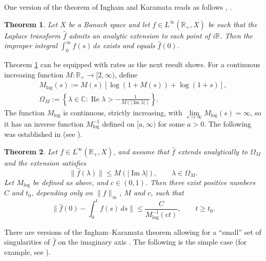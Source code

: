 \documentclass[11pt]{amsart}
\newtheorem{theorem}{Theorem}[section]
\theoremstyle{definition}
\theoremstyle{remark}
\numberwithin{equation}{section}
\begin{document}
One version of the theorem of Ingham and Karamata reads as follows \cite[Theorem 4.4.1]{ABHN01}, \cite[Theorem III.7.1]{Ko04}.

\begin{theorem}\label{ingham}
Let $X$ be a Banach space and let $f \in L^\infty(\mathbb R_+, X)$ be such that the Laplace transform $\widehat f$ admits an analytic extension to each point of $i\mathbb R$.
Then the improper integral $\int_{0}^{\infty}f(s)\, ds$ exists and equals $\widehat f(0)$.
\end{theorem}

Theorem \ref{ingham} can be equipped with rates as the next result shows.
For a continuous increasing function $M: \mathbb R_+\to [2,\infty)$, define
\begin{eqnarray}
M_{\log}(s) := M(s) [\log(1 +M(s)) + \log(1 + s)],\label{mlog}\\
\Omega_M:=\left \{\lambda \in \mathbb C: {\operatorname{Re}}\lambda > - \frac{1}{M(|{\operatorname{Im}} \lambda|)}\right \}. \label{omm}
\end{eqnarray}
The function  $M_{\log}$ is continuous, strictly increasing, with $\lim\limits_{s\to\infty} M_{\log}(s) = \infty$, so it has an inverse function $M_{\log}^{-1}$ defined on $[a,\infty)$ for some $a>0$.  The following was established in \cite{BaDu} (see \cite[Theorem 4.4.6]{ABHN01}).

\begin{theorem}\label{inghamrates}
Let $f \in L^{\infty}(\mathbb R_+,X)$, and assume that $\widehat f$ extends analytically to $\Omega_M$ and the extension satisfies
\begin{equation}  \label{resbound}
\|\widehat f(\lambda)\|\le M(|{\operatorname{Im}} \lambda |), \qquad \lambda \in \Omega_M.
\end{equation}
Let $M_{\log}$ be defined as above, and $c \in (0, 1)$. Then there exist positive numbers $C$ and $t_0$, depending
only on $\|f\|_{\infty}$, $M$  and $c$,  such that
\begin{equation} \label{Mlogest}
\Big\|\widehat f (0)-\int_{0}^{t}f(s)\,ds\Big\|\le \frac{C}{M^{-1}_{\log}(ct)}, \qquad t \ge t_0.
\end{equation}
\end{theorem}

There are versions of the Ingham--Karamata theorem allowing for a ``small'' set of singularities of $\widehat f$ on the imaginary axis \cite{ArBa88}.  The following is the simple case (for example, see \cite[Theorem 4.4.8]{ABHN01}).
\end{document}
